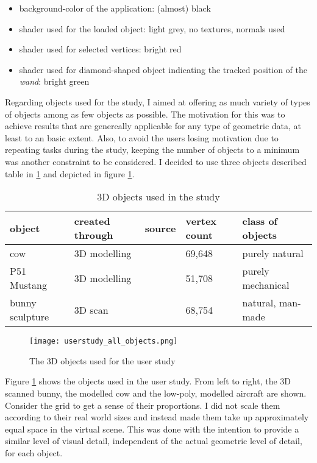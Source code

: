 \begin{itemize}
	\item background-color of the application: (almost) black
	\item shader used for the loaded object: light grey, no textures, normals used
	\item shader used for selected vertices: bright red
	\item shader used for diamond-shaped object indicating the tracked position of the \textit{wand}: bright green
\end{itemize}


Regarding objects used for the study, I aimed at offering as much variety of types of objects among as few objects as possible. The motivation for this was to achieve results that are genereally applicable for any type of geometric data, at least to an basic extent. Also, to avoid the users losing motivation due to repeating tasks during the study, keeping the number of objects to a minimum was another constraint to be considered.
I decided to use three objects described table in \ref{tab:userstudy_objects} and depicted in figure \ref{fig:all_objects}.

\begin{table}[]
\centering
	\begin{tabular}{l|l|l|l|l}
		object	& created through	& source	& vertex count	& class of objects	\\ \hline
		cow	& 3D modelling		& \cite{cow}	& 69,648	& purely natural	\\
		P51 Mustang	&	3D modelling	& \cite{P51}	& 51,708	& purely mechanical	\\
		bunny sculpture	&	3D scan	& \cite{bun}	& 68,754	& natural, man-made	
	\end{tabular}
	\caption{3D objects used in the study}
	\label{tab:userstudy_objects}
\end{table}

\begin{figure}[htb]
  \centering
  \texttt{[image: userstudy\_all\_objects.png]}\\ %
  \caption{The 3D objects used for the user study}\label{fig:all_objects}
\end{figure}

Figure \ref{fig:all_objects} shows the objects used in the user study. From left to right, the 3D scanned bunny, the modelled cow and the low-poly, modelled aircraft are shown. Consider the grid to get a sense of their proportions. I did not scale them according to their real world sizes and instead made them take up approximately equal space in the virtual scene. This was done with the intention to provide a similar level of visual detail, independent of the actual geometric level of detail, for each object. %

